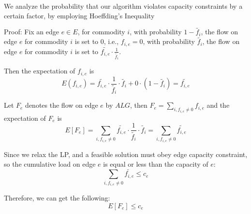 \documentclass[conference]{IEEEtran}
\begin{document}
We analyze the probability that our algorithm violates capacity constraints by a certain factor, by employing Hoeffding's Inequality 

Proof: Fix an edge $e \in E$, for commodity $i$, with probability $1-\tilde{f_i}$, the flow on edge $e$ for commodity $i$ is set to 0, i.e., $f_{i,e}=0$, with probability $\tilde{f_i}$, the flow on edge $e$ for commodity $i$ is set to $\tilde{f_{i,e}} \cdot \frac{1}{\tilde{f_i}}$. 

Then the expectation of $f_{i,e}$ is 
\begin{equation}
E(f_{i,e}) = \tilde{f_{i,e}} \cdot \frac{1}{\tilde{f_i}} \cdot  \tilde{f_i}+ 0 \cdot (1-\tilde{f_i}) = \tilde{f_{i,e}}
\end{equation}

Let $F_e$ denotes the flow on edge $e$ by $ALG$, then $F_e = \sum_{i, f_{i,e} \neq 0}{f_{i,e}}$ and the expectation of $F_e$ is 
\begin{equation} \label{expect}
E[F_e] = \sum_{i, f_{i,e} \neq 0}\tilde{f_{i,e}} \cdot \frac{1}{\tilde{f_i}} \cdot  \tilde{f_i} = \sum_{i, f_{i,e} \neq 0}\tilde{f_{i,e}}
\end{equation}

Since we relax the LP, and a feasible solution must obey edge capacity constraint, so the cumulative load on edge $e$ is equal or less than the capacity of $e$:
\begin{equation}
\sum_{i, f_{i,e} \neq 0}\tilde{f_{i,e}} \le c_e
\end{equation}

Therefore, we can get the following:
\begin{equation} \label{equ:edgecap}
E[F_e] \le c_e
\end{equation}
\end{document}
